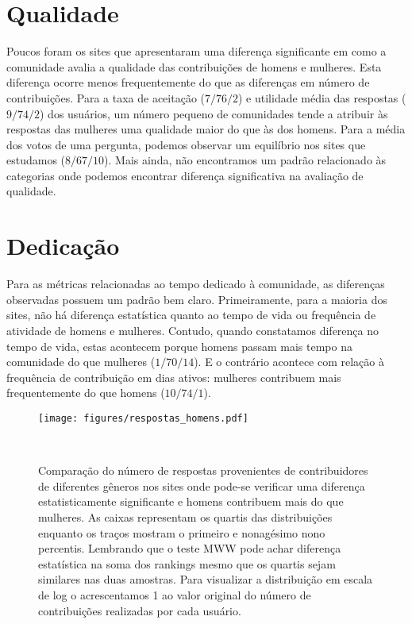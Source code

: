 \section{Qualidade} %
\label{subsec:qualidade}
Poucos foram os sites que apresentaram uma diferença significante em como a comunidade avalia a qualidade das contribuições de homens e mulheres. Esta diferença ocorre menos frequentemente do que as diferenças em número de contribuições. Para a taxa de aceitação ($7/76/2$) e utilidade média das respostas ($9/74/2$) dos usuários, um número pequeno de comunidades tende a atribuir às respostas das mulheres uma qualidade maior do que às dos homens. Para a média dos votos de uma pergunta, podemos observar um equilíbrio nos sites que estudamos ($8/67/10$). Mais ainda, não encontramos um padrão relacionado às categorias onde podemos encontrar diferença significativa na avaliação de qualidade.



\section{Dedicação}%
Para as métricas relacionadas ao tempo dedicado à comunidade, as diferenças observadas possuem um padrão bem claro. Primeiramente, para a maioria dos sites, não há diferença estatística quanto ao tempo de vida ou frequência de atividade de homens e mulheres. Contudo, quando constatamos diferença no tempo de vida, estas acontecem porque homens passam mais tempo na comunidade do que mulheres ($1/70/14$). E o contrário acontece com relação à frequência de contribuição em dias ativos: mulheres contribuem mais frequentemente do que homens ($10/74/1$).

\begin{figure}[!b]
  \raggedleft
  \texttt{[image: figures/respostas\_homens.pdf]}
  \caption[Comparação do número de respostas em comunidades onde homens respondem mais.]{Comparação do número de respostas provenientes de contribuidores de diferentes gêneros nos sites onde pode-se verificar uma diferença estatisticamente significante e homens contribuem mais do que mulheres. As caixas representam os quartis das distribuições enquanto os traços mostram o primeiro e nonagésimo nono percentis. Lembrando que o teste MWW pode achar diferença estatística na soma dos rankings mesmo que os quartis sejam similares nas duas amostras. Para visualizar a distribuição em escala de log o acrescentamos 1 ao valor original do número de contribuições realizadas por cada usuário. }~\label{fig:answers-men}
\end{figure}

